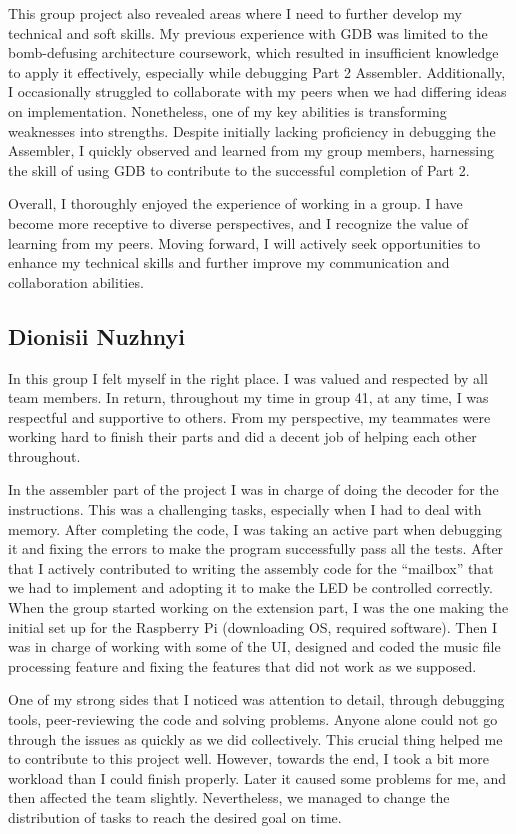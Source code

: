 \documentclass[11pt, oneside, UKenglish]{article}
\begin{document}
This group project also revealed areas where I need to further develop my technical and soft skills.
My previous experience with GDB was limited to the bomb-defusing architecture coursework, which resulted in insufficient knowledge to apply it effectively, especially while debugging Part 2 Assembler.
Additionally, I occasionally struggled to collaborate with my peers when we had differing ideas on implementation.
Nonetheless, one of my key abilities is transforming weaknesses into strengths. Despite initially lacking proficiency in debugging the Assembler, I quickly observed and learned from my group members, harnessing the skill of using GDB to contribute to the successful completion of Part 2. 

Overall, I thoroughly enjoyed the experience of working in a group.
I have become more receptive to diverse perspectives, and I recognize the value of learning from my peers.
Moving forward, I will actively seek opportunities to enhance my technical skills and further improve my communication and collaboration abilities.

\subsection{Dionisii Nuzhnyi}

In this group I felt myself in the right place. I was valued and respected by all team members.
In return, throughout my time in group 41, at any time, I was respectful and supportive to others.
From my perspective, my teammates were working hard to finish their parts and did a decent job of helping each other throughout. 

In the assembler part of the project I was in charge of doing the decoder for the instructions.
This was a challenging tasks, especially when I had to deal with memory. After completing the code, I was taking an active part when debugging it and fixing the errors to make the program successfully pass all the tests.
After that I actively contributed to writing the assembly code for the \enquote{mailbox} that we had to implement and adopting it to make the LED be controlled correctly.
When the group started working on the extension part, I was the one making the initial set up for the Raspberry Pi (downloading OS, required software).
Then I was in charge of working with some of the UI, designed and coded the music file processing feature and fixing the features that did not work as we supposed.

One of my strong sides that I noticed was attention to detail, through debugging tools, peer-reviewing the code and solving problems.
Anyone alone could not go through the issues as quickly as we did collectively. This crucial thing helped me to contribute to this project well.
However, towards the end, I took a bit more workload than I could finish properly.
Later it caused some problems for me, and then affected the team slightly. Nevertheless, we managed to change the distribution of tasks to reach the desired goal on time.
\end{document}
